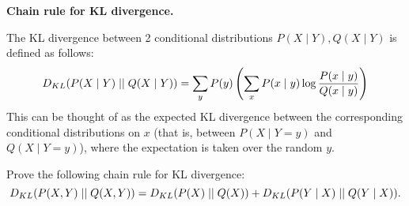 \item {} \textbf{Chain rule for KL divergence.}

The KL divergence between 2
conditional distributions $P(X\mid Y),Q(X\mid Y)$ is defined as follows:
\[
D_{KL}(P(X\mid Y)\mid \mid Q(X\mid Y))
= \sum_y P(y) \left(\sum_x P(x\mid y)\log\frac{P(x\mid y)}{Q(x\mid y)}\right)
\]
This can be thought of as the expected KL divergence between the
corresponding conditional distributions on $x$ (that is, between
$P(X\mid Y=y)$ and $Q(X\mid Y=y)$), where the expectation is taken over the
random $y$.

Prove the following chain rule for KL divergence:
$$ D_{KL}(P(X,Y)\mid \mid Q(X,Y)) = D_{KL}(P(X)\mid \mid Q(X)) + D_{KL}(P(Y\mid X)\mid \mid Q(Y\mid X)). $$
